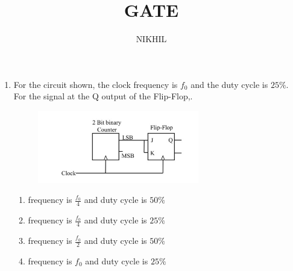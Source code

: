 \documentclass{article}
\begin{document}
\title{GATE}
\author{NIKHIL}
\maketitle
	\begin{enumerate}
		\item For the circuit shown, the clock frequency is $f_0$ and the duty cycle is $25\%$. For the signal at the Q output of the Flip-Flop,\underline{\hspace{4cm}}.
		\begin{figure}[h]
			\centering
			\includegraphics[width=200pt]{gatefigs/Circuit.jpg}
			\label{fig:circuit}
		\end{figure}
			\begin{enumerate}
			\item frequency is $\frac{{f_0}}{4}$ and duty cycle is $50\%$
			\item frequency is $\frac{{f_0}}{4}$ and duty cycle is $25\%$
			\item frequency is $\frac{{f_0}}{2}$ and duty cycle is $50\%$
			\item frequency is ${f_0}$ and duty cycle is $25\%$
		\end{enumerate}
	\end{enumerate}
\end{document}
